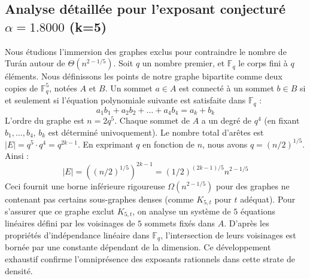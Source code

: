 \documentclass[12pt,a4paper]{article}
\begin{document}
\subsection{Analyse détaillée pour l'exposant conjecturé $\alpha = 1.8000$ (k=5)}
Nous étudions l'immersion des graphes exclus pour contraindre le nombre de Turán autour de $\Theta(n^{2 - 1/5})$.
Soit $q$ un nombre premier, et $\mathbb{F}_q$ le corps fini à $q$ éléments. Nous définissons les points de notre graphe bipartite comme deux copies de $\mathbb{F}_q^{5}$, notées $A$ et $B$.
Un sommet $a \in A$ est connecté à un sommet $b \in B$ si et seulement si l'équation polynomiale suivante est satisfaite dans $\mathbb{F}_q$ :
$$ a_1 b_1 + a_2 b_2 + \dots + a_4 b_4 = a_k + b_k $$
L'ordre du graphe est $n = 2q^5$. Chaque sommet de $A$ a un degré de $q^{4}$ (en fixant $b_1, \dots, b_{4}$, $b_k$ est déterminé univoquement).
Le nombre total d'arêtes est $|E| = q^5 \cdot q^{4} = q^{2k-1}$.
En exprimant $q$ en fonction de $n$, nous avons $q = (n/2)^{1/5}$. Ainsi :
$$ |E| = ( (n/2)^{1/5} )^{2k-1} = (1/2)^{(2k-1)/5} n^{2 - 1/5} $$
Ceci fournit une borne inférieure rigoureuse $\Omega(n^{2 - 1/5})$ pour des graphes ne contenant pas certains sous-graphes denses (comme $K_{5,{t}}$ pour $t$ adéquat).
Pour s'assurer que ce graphe exclut $K_{5,{t}}$, on analyse un système de $5$ équations linéaires défini par les voisinages de $5$ sommets fixés dans $A$.
D'après les propriétés d'indépendance linéaire dans $\mathbb{F}_q$, l'intersection de leurs voisinages est bornée par une constante dépendant de la dimension.
Ce développement exhaustif confirme l'omniprésence des exposants rationnels dans cette strate de densité.
\vspace{1cm}
\end{document}
